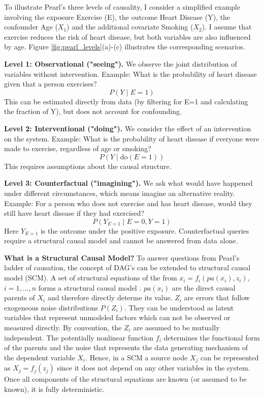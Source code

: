To illustrate Pearl's three levels of causality, I consider a simplified example involving the exposure Exercise (E), the outcome Heart Disease (Y), the confounder Age ($X_1$) and the additional covariate Smoking ($X_2$). I assume that exercise reduces the risk of heart disease, but both variables are also influenced by age. Figure \ref{fig:pearl_levels}(a)-(c) illustrates the corresponding scenarios.

\textbf{Level 1: Observational ("seeing").}  
We observe the joint distribution of variables without intervention.  
Example: What is the probability of heart disease given that a person exercises?  
\[
P(Y \mid E = 1)
\]
This can be estimated directly from data (by filtering for E=1 and calculating the fraction of Y), but does not account for confounding.


\textbf{Level 2: Interventional ("doing").}  
We consider the effect of an intervention on the system.  
Example: What is the probability of heart disease if everyone were made to exercise, regardless of age or smoking?  
\[
P(Y \mid \text{do}(E = 1))
\]
This requires assumptions about the causal structure.


\textbf{Level 3: Counterfactual ("imagining").}  
We ask what would have happened under different circumstances, which means imagine an alternative reality.
Example: For a person who does not exercise and has heart disease, would they still have heart disease if they had exercised?  
\[
P(Y_{E=1} \mid E = 0, Y = 1)
\]
Here $Y_{E=1}$ is the outcome under the positive exposure. Counterfactual queries require a structural causal model and cannot be answered from data alone.






\textbf{What is a Structural Causal Model?}
To answer questions from Pearl's ladder of causation, the concept of DAG's can be extended to structural causal model (SCM). A set of structural equations of the from $x_i = f_i(pa(x_i), z_i)$, $i=1,...,n$ forms a structural causal model \citep{pearl_book2009}. $pa(x_i)$ are the direct causal parents of $X_i$ and therefore directly determe its value. $Z_i$ are errors that follow exogeneous noise distributions $P(Z_i)$. They can be understood as latent variables that represent unmodeled factors which can not be observed or measured directly. By convention, the $Z_i$ are assumed to be mutually independent. %
The potentially nonlinear function $f_i$ determines the functional form of the parents and the noise that represents the data generating mechanism of the dependent variable $X_i$. Hence, in a SCM a source node $X_j$ can be represented as $X_j = f_j(z_j)$ since it does not depend on any other variables in the system. Once all components of the structural equations are known (or assumed to be known), it is fully deterministic. 

